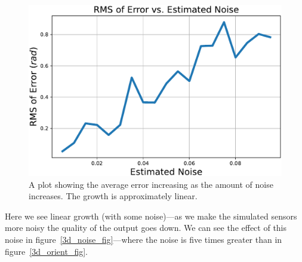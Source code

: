 \documentclass[12pt]{article}
\begin{document}
\begin{figure}[tp]
	\centering
	
	\includegraphics[width=\textwidth]{3d-rms.pdf}
	
	\caption{A plot showing the average error increasing as the amount of noise increases. The growth is approximately linear.}
	
	\label{3d_rms_fig}
\end{figure}

Here we see linear growth (with some noise)---as we make the simulated sensors more noisy the quality of the output goes down. We can see the effect of this noise in figure~\ref{3d_noise_fig}---where the noise is five times greater than in figure~\ref{3d_orient_fig}.
\end{document}
